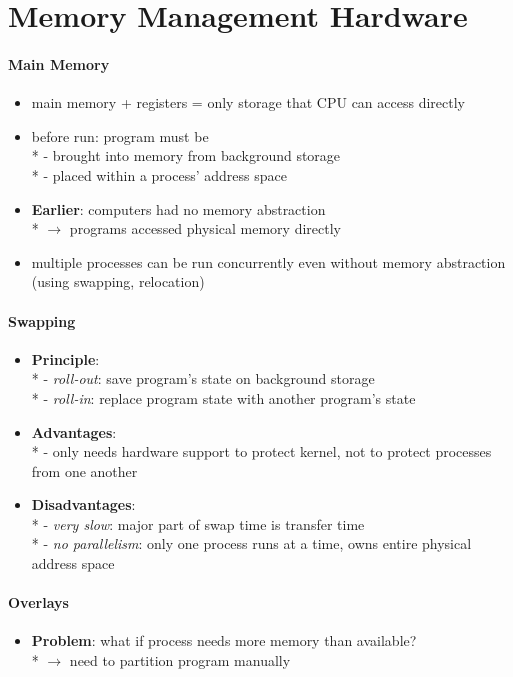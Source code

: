 \section{Memory Management Hardware}

\paragraph{Main Memory}
\begin{itemize}
  \item main memory + registers = only storage that CPU can access directly
  \item before run: program must be \\*
    - brought into memory from background storage \\*
    - placed within a process' address space
  \item \textbf{Earlier}: computers had no memory abstraction \\*
    \( \to \) programs accessed physical memory directly
  \item multiple processes can be run concurrently even without memory abstraction (using swapping, relocation)
\end{itemize}

\paragraph{Swapping}
\begin{itemize}
  \item \textbf{Principle}: \\*
    - \emph{roll-out}: save program's state on background storage \\*
    - \emph{roll-in}: replace program state with another program's state
  \item \textbf{Advantages}: \\*
    - only needs hardware support to protect kernel, not to protect processes from one another
  \item \textbf{Disadvantages}: \\*
    - \emph{very slow}: major part of swap time is transfer time \\*
    - \emph{no parallelism}: only one process runs at a time, owns entire physical address space
\end{itemize}

\paragraph{Overlays}
\begin{itemize}
  \item \textbf{Problem}: what if process needs more memory than available? \\*
    \( \to \) need to partition program manually
\end{itemize}

